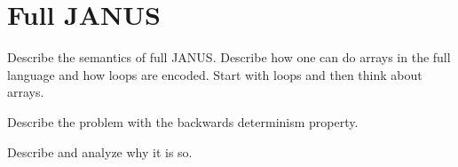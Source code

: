 \chapter{Full JANUS}


Describe the semantics of full JANUS. Describe how one can do arrays
in the full language and how loops are encoded. Start with loops and
then think about arrays.

Describe the problem with the backwards determinism property.

Describe and analyze why it is so.
